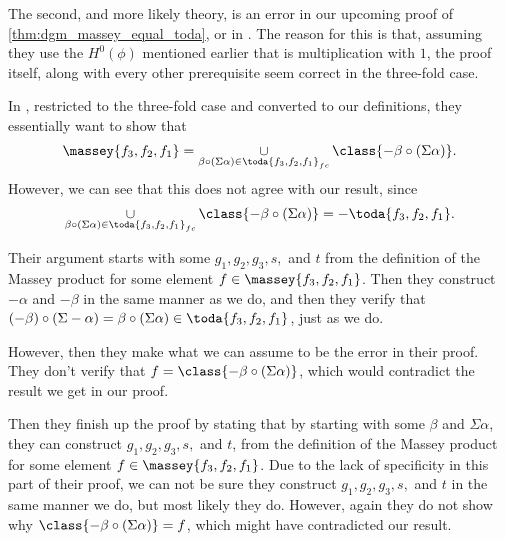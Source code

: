 \begin{remark}
    The second, and more likely theory, is an error in our upcoming proof of \autoref{thm:dgm_massey_equal_toda}, or in \cite[Proposition 4.2.8]{Jasso-Muro_2023}. The reason for this is that, assuming they use the \( H^0(\phi) \) mentioned earlier that is multiplication with \( 1 \), the proof itself, along with every other prerequisite seem correct in the three-fold case.

    In \cite[Proposition 4.2.8]{Jasso-Muro_2023}, restricted to the three-fold case and converted to our definitions, they essentially want to show that
    \[
        \massey{f_3, f_2, f_1} = \union_{\beta \circ (\Sigma \alpha) \in \toda{f_3, f_2, f_1}_{fc}}  \class{- \beta \circ (\Sigma \alpha)}.
    \]
    However, we can see that this does not agree with our result, since
    \[
        \union_{\beta \circ (\Sigma \alpha) \in \toda{f_3, f_2, f_1}_{fc}}  \class{- \beta \circ (\Sigma \alpha)} = -\toda{f_3, f_2, f_1}.
    \]

    Their argument starts with some \( g_1, g_2, g_3, s, \) and \( t \) from the definition of the Massey product for some element \( f \in \massey{f_3, f_2, f_1} \). Then they construct \( -\alpha \) and \( -\beta \) in the same manner as we do, and then they verify that \( (-\beta) \circ (\Sigma -\alpha) = \beta \circ (\Sigma \alpha) \in \toda{f_3, f_2, f_1} \), just as we do.

    However, then they make what we can assume to be the error in their proof. They don't verify that \( f = \class{- \beta \circ (\Sigma \alpha)} \), which would contradict the result we get in our proof.

    Then they finish up the proof by stating that by starting with some \( \beta \) and \( \Sigma \alpha \), they can construct \( g_1, g_2, g_3, s, \) and \( t \), from the definition of the Massey product for some element \( f \in \massey{f_3, f_2, f_1} \). Due to the lack of specificity in this part of their proof, we can not be sure they construct \( g_1, g_2, g_3, s, \) and \( t \) in the same manner we do, but most likely they do. However, again they do not show why \( \class{- \beta \circ (\Sigma \alpha)} = f \), which might have contradicted our result.
\end{remark}